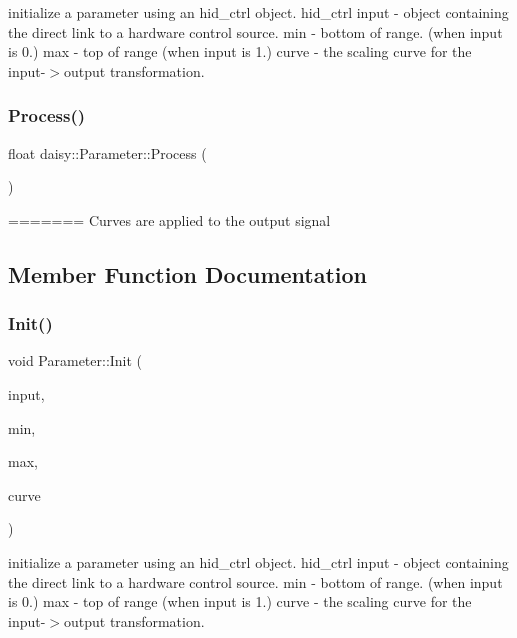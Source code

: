 initialize a parameter using an hid\+\_\+ctrl object. hid\+\_\+ctrl input -\/ object containing the direct link to a hardware control source. min -\/ bottom of range. (when input is 0.) max -\/ top of range (when input is 1.) curve -\/ the scaling curve for the input-\/$>$output transformation. \mbox{\label{classdaisy_1_1_parameter_a6af6747924f1651e6698a4d72c86532d}} 
\subsubsection{\texorpdfstring{Process()}{Process()}}
{\footnotesize\ttfamily float daisy\+::\+Parameter\+::\+Process (\begin{DoxyParamCaption}{ }\end{DoxyParamCaption})}
=======
Curves are applied to the output signal 

\subsection{Member Function Documentation}
\mbox{\label{classdaisy_1_1_parameter_a1904b8eaea19797e761f391fe0bf987a}} 
\subsubsection{\texorpdfstring{Init()}{Init()}}
{\footnotesize\ttfamily void Parameter\+::\+Init (\begin{DoxyParamCaption}\item[{\hyperlink{classdaisy_1_1_analog_control}{Analog\+Control}}]{input,  }\item[{float}]{min,  }\item[{float}]{max,  }\item[{\hyperlink{classdaisy_1_1_parameter_a2fcb1b7095721f0de77594aabb9594da}{Curve}}]{curve }\end{DoxyParamCaption})}

initialize a parameter using an hid\+\_\+ctrl object. hid\+\_\+ctrl input -\/ object containing the direct link to a hardware control source. min -\/ bottom of range. (when input is 0.) max -\/ top of range (when input is 1.) curve -\/ the scaling curve for the input-\/$>$output transformation. \mbox{\label{classdaisy_1_1_parameter_ae966c4abcd064809da4a497b45d84a83}} 
